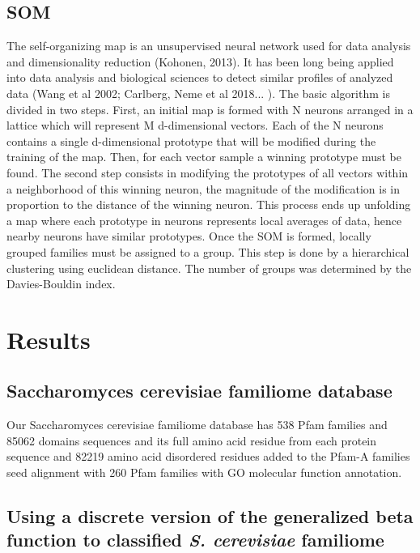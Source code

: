 \documentclass[preprint,12pt]{elsarticle}
\begin{document}
\subsection{SOM}

The self-organizing map is an unsupervised neural network used for data analysis and dimensionality reduction (Kohonen, 2013). It has been long being applied into data analysis and biological sciences to detect similar profiles of analyzed data (Wang et al 2002; Carlberg, Neme et al 2018... ). The basic algorithm is divided in two steps. First, an initial map is formed with N neurons arranged in a lattice which will represent M d-dimensional vectors. Each of the N neurons contains a single d-dimensional prototype that will be modified during the training of the map. Then, for each vector sample a winning prototype must be found. The second step consists in modifying the prototypes of all vectors within a neighborhood of this winning neuron, the magnitude of the modification is in proportion to the distance of the winning neuron. This process ends up unfolding a map where each prototype in neurons represents local averages of data, hence nearby neurons have similar prototypes.
Once the SOM is formed, locally grouped families must be assigned to a group. This step is done by a hierarchical clustering using euclidean distance. The number of groups was determined by the Davies-Bouldin index.


\section{Results}
\label{S:1}

\subsection{Saccharomyces cerevisiae familiome database}

Our Saccharomyces cerevisiae familiome database has 538 Pfam families and 85062 domains sequences and its full amino acid residue from each protein sequence and 82219  amino acid disordered residues added to the Pfam-A families seed alignment with 260 Pfam families with GO molecular function annotation.

\subsection{Using a discrete version of the generalized beta function to classified {\it S. cerevisiae} familiome}
\end{document}
